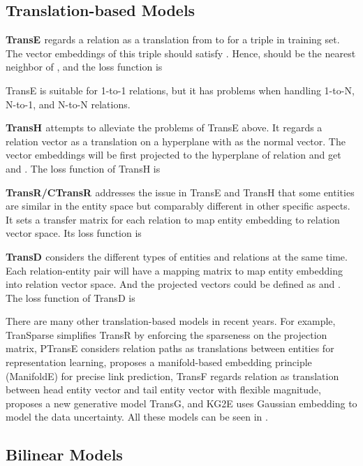 \documentclass[11pt,a4paper]{article}
\begin{document}
  \subsection{Translation-based Models}
  
  \textbf{TransE \cite{TransE}} regards a relation  as a translation from  to  for a triple
   in training set. The vector embeddings of this triple should satisfy .
  Hence,  should be the nearest neighbor of , and the loss function is 
  
  TransE is suitable for 1-to-1 relations, but it has problems when handling 1-to-N, N-to-1, and N-to-N relations.
  
  \noindent\textbf{TransH \cite{TransH}} attempts to alleviate the problems of TransE above. It regards a relation vector  
  as a translation on a hyperplane with  as the normal vector. The vector embeddings will be first projected to the 
  hyperplane of relation  and get 
  and .
  The loss function of TransH is
   
  
  \noindent\textbf{TransR/CTransR \cite{TransR}} addresses the issue in TransE and TransH that some entities are similar in the entity space but comparably 
  different in other specific aspects. 
  It sets a transfer matrix  for each relation  to map entity embedding to relation vector space. 
  Its loss function is
   
  
  \noindent\textbf{TransD \cite{TransD}} considers the different types of entities and relations at the same time. Each 
  relation-entity pair  will have a mapping matrix  to map entity embedding into relation vector space.
  And the projected vectors could be defined as   and . The loss
  function of TransD is
  
  
  There are many other translation-based models in recent years. For example, 
  TranSparse \cite{TranSparse} simplifies TransR by enforcing the sparseness on the projection matrix, 
  PTransE \cite{PTransE} considers relation paths as translations between entities for representation learning,
  \cite{ManifoldE} proposes a manifold-based embedding principle (ManifoldE) for precise link prediction, 
  TransF \cite{TransF} regards relation as translation between head entity vector and tail entity vector with flexible magnitude,
  \cite{TransG} proposes a new generative model TransG, and KG2E \cite{KG2E} uses Gaussian embedding to model the data uncertainty.
  All these models can be seen in \cite{Survey}.
  
  \subsection{Bilinear Models}
  
\end{document}
